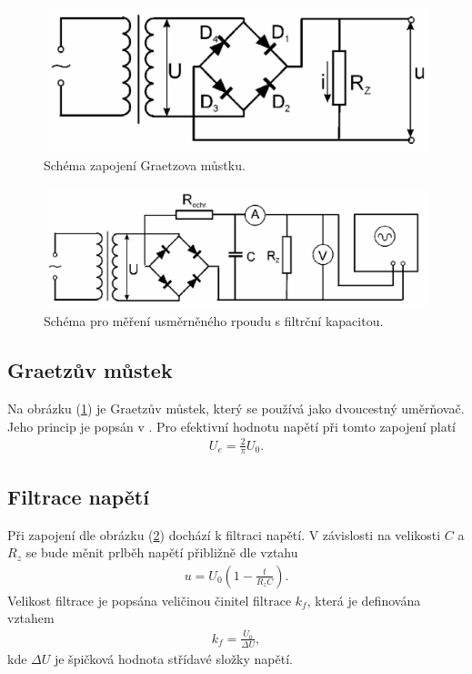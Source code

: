 \documentclass[a4paper,12pt]{article}
\begin{document}
\begin{figure}
\includegraphics[width=6in]{sch1.eps}
\caption{Schéma zapojení Graetzova můstku.}
\label{sch1}
\end{figure}

\begin{figure}
\includegraphics[width=6in]{sch2.eps}
\caption{Schéma pro měření usměrněného rpoudu s filtrční kapacitou.}
\label{sch2}
\end{figure}


\subsection{Graetzův můstek}
Na obrázku (\ref{sch1}) je Graetzův můstek, který se používá jako dvoucestný uměrňovač. Jeho princip je popsán v \cite{text}. 
Pro efektivní hodnotu napětí při tomto zapojení platí
\begin{eqnarray}
U_e=\frac{2}{\pi}U_0.
\label{U_e2}
\end{eqnarray}

\subsection{Filtrace napětí}
Při zapojení dle obrázku (\ref{sch2}) dochází k filtraci napětí. V závislosti na velikosti $C$ a $R_z$ se bude měnit prlběh napětí přibližně dle vztahu
\begin{eqnarray}
u=U_0\left(1-\frac{t}{R_zC}\right).
\end{eqnarray}
Velikost filtrace je popsána veličinou činitel filtrace $k_f$, která je definována vztahem
\begin{eqnarray}
k_f=\frac{U_0}{\Delta U},
\end{eqnarray}
kde $\Delta U$ je špičková hodnota střídavé složky napětí.
\end{document}
